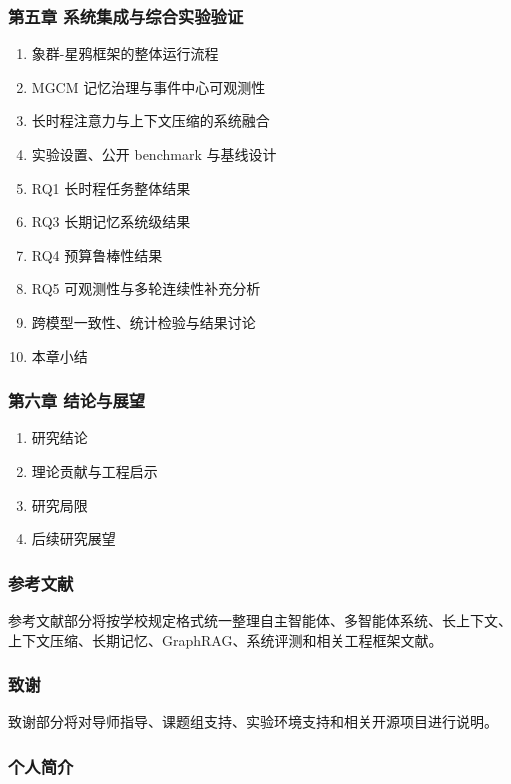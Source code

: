 \documentclass[UTF8,a4paper,zihao=-4,fontset=windows]{ctexart}
\newcommand{\framework}{象群-星鸦框架}
\begin{document}
\subsubsection*{第五章 系统集成与综合实验验证}
\begin{enumerate}[label=5.\arabic*]
  \item \framework 的整体运行流程
  \item MGCM 记忆治理与事件中心可观测性
  \item 长时程注意力与上下文压缩的系统融合
  \item 实验设置、公开 benchmark 与基线设计
  \item RQ1 长时程任务整体结果
  \item RQ3 长期记忆系统级结果
  \item RQ4 预算鲁棒性结果
  \item RQ5 可观测性与多轮连续性补充分析
  \item 跨模型一致性、统计检验与结果讨论
  \item 本章小结
\end{enumerate}

\subsubsection*{第六章 结论与展望}
\begin{enumerate}[label=6.\arabic*]
  \item 研究结论
  \item 理论贡献与工程启示
  \item 研究局限
  \item 后续研究展望
\end{enumerate}

\subsubsection*{参考文献}

参考文献部分将按学校规定格式统一整理自主智能体、多智能体系统、长上下文、上下文压缩、长期记忆、GraphRAG、系统评测和相关工程框架文献。

\subsubsection*{致谢}

致谢部分将对导师指导、课题组支持、实验环境支持和相关开源项目进行说明。

\subsubsection*{个人简介}
\end{document}
